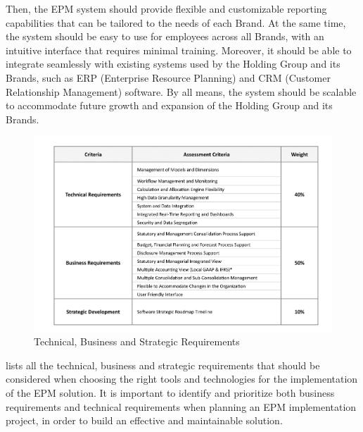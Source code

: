 \documentclass[12pt,a4paper,openright,twoside]{book}
\begin{document}
Then, the EPM system should provide flexible and customizable reporting capabilities that can be tailored to the needs of each Brand.
%
At the same time, the system should be easy to use for employees across all Brands, with an intuitive interface that requires minimal training.
%
Moreover, it should be able to integrate seamlessly with existing systems used by the Holding Group and its Brands, such as ERP (Enterprise Resource Planning) and CRM (Customer Relationship Management) software.
%
By all means, the system should be scalable to accommodate future growth and expansion of the Holding Group and its Brands.

\begin{figure}[ht]
	\centering
	\includegraphics[width=\linewidth]{figures/requirements.pdf}
	\caption{Technical, Business and Strategic Requirements}
	\label{fig:requirements}
\end{figure}

 lists all the technical, business and strategic requirements that should be considered when choosing the right tools and technologies for the implementation of the EPM solution.
%
It is important to identify and prioritize both business requirements and technical requirements when planning an EPM implementation project, in order to build an effective and maintainable solution.
\end{document}
